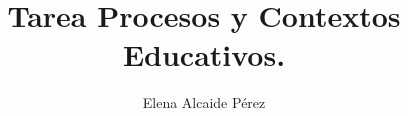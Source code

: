 \documentclass[a4paper, openright, 11pt, titlepage]{report}
\title{Tarea Procesos y Contextos Educativos.}
\author{Elena Alcaide Pérez}
\theoremstyle{definition}\newtheorem{defin}[propo]{Definition}
\theoremstyle{definition}\newtheorem{obser}[propo]{Remark}
\theoremstyle{definition}\newtheorem{ejem}[propo]{Ejemplo}
\theoremstyle{definition}\newtheorem{algoritmo}[propo]{Algoritmo}
\begin{document}
\sloppy







\end{document}
